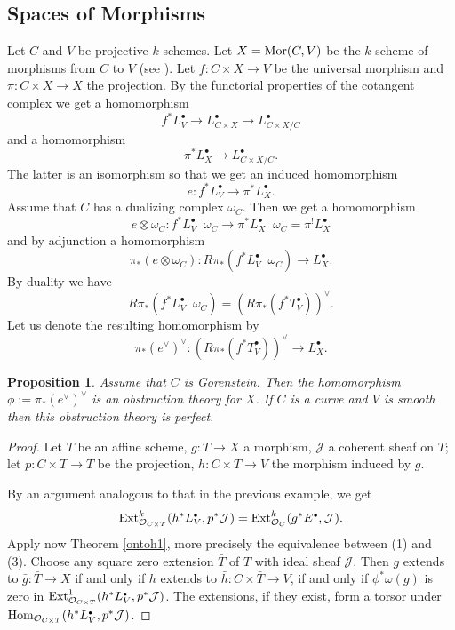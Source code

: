 \documentclass[11pt]{article}
\theoremstyle{plain}
\newtheorem{prop}{Proposition}[section]
\theoremstyle{definition}
\newenvironment{pf}{\begin{proof}}{\end{proof}}
\newcommand{\dual}[1]{{{#1}^{\vee}}}
\newcommand{\upst}{^{\ast}}
\newcommand{\upsh}{^{!}}
\newcommand{\lst}{_{\ast}}
\newcommand{\com}{^{\scriptscriptstyle\bullet}}
\renewcommand{\O}{{\mathcal{O}}}
\newcommand{\jJ}{{\mathcal{J}}}
\newcommand{\Mor}{\mathop{\rm Mor}\nolimits}
\newcommand{\Hom}{\mathop{\rm Hom}\nolimits}
\newcommand{\ltensor}{\mathop{\displaystyle\stackrel{L}{\otimes}}}
\theoremstyle{plain}
\theoremstyle{definition}
\theoremstyle{remark}
\begin{document}
\subsection{Spaces of Morphisms}

Let \(C\) and \(V\) be projective \(k\)-schemes. Let \(X=\Mor(C,V)\) be the \(k\)-scheme
of morphisms from \(C\) to \(V\) (see \cite{fgaIV}). Let \(f:C\times X\rightarrow V\)
be the universal morphism and \(\pi:C\times X\rightarrow X\) the
projection. By the functorial properties of the cotangent complex we
get a homomorphism
\[
f\upst L\com_V\longrightarrow L\com_{C\times X}\longrightarrow
L\com_{C\times X/C}
\]
and a homomorphism
\[
\pi\upst L\com_X\longrightarrow L\com_{C\times X/C}.
\]
The latter is an isomorphism so that we get an induced homomorphism
\[
e:f\upst L_V\com\longrightarrow\pi\upst L_X\com.
\]
Assume that \(C\) has a
dualizing complex \(\omega_C\). Then we get a homomorphism
\[
e\otimes\omega_C:f\upst L_V\com\ltensor\omega_C\longrightarrow\pi\upst
L_X\com\ltensor\omega_C=\pi\upsh L_X\com
\]
and by adjunction a homomorphism
\[
\pi\lst(e\otimes\omega_C):R\pi\lst(f\upst
L_V\com\ltensor\omega_C)\longrightarrow L_X\com.
\]
By duality we have
\[
R\pi\lst(f\upst L_V\com\ltensor\omega_C)=\dual{(R\pi\lst(f\upst T_V\com))}.
\]
Let us denote the resulting homomorphism by
\[
\dual{\pi\lst(\dual{e})}:\dual{(R\pi\lst(f\upst T_V\com))}\longrightarrow
L_X\com.
\]

\begin{prop}  \label{feot} Assume that \(C\) is Gorenstein. Then
the homomorphism
\(\phi:=\dual{\pi\lst(\dual{e})}\) is an obstruction theory for \(X\). If \(C\) is a
curve and \(V\) is smooth then this obstruction theory is perfect.
\end{prop}
\begin{pf} Let \(T\) be an affine scheme, \(g:T\to X\) a
morphism, \(\jJ\) a coherent sheaf on \(T\); let \(p:C\times T\to T\) be the
projection, \(h:C\times T\to V\) the morphism induced by \(g\).

By an argument analogous to that in the previous example, we get
\[
\eext^k_{\O_{C\times T}}(h^*L_V\com,p^*\jJ)=
\eext^k_{\O_C}(g^*E\com,\jJ).
\]
Apply now Theorem \ref{ontoh1}, more precisely the equivalence between
(1) and (3).  Choose any square zero extension \(\bar T\) of \(T\) with
ideal sheaf \(\jJ\). Then \(g\) extends to \(\bar g:\bar T\to X\) if and
only if \(h\) extends to \(\bar h:C\times \bar T\to V\), if and only if
\(\phi^*\omega(g)\) is zero in \(\eext^1_{\O_{C\times
T}}(h^*L_V\com,p^*\jJ)\). The extensions, if they exist, form a torsor
under \(\Hom_{\O_{C\times T}}(h^*L_V\com,p^*\jJ)\).
\end{pf}
\end{document}
